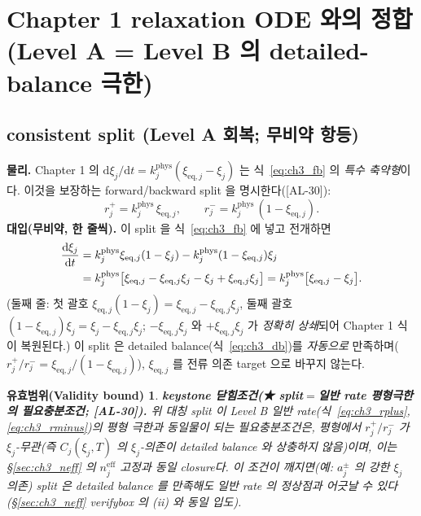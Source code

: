 \documentclass[11pt,a4paper]{article}
\newtheorem*{boundbox}{유효범위(Validity bound)}
\newcommand{\dd}{\mathrm{d}}
\newcommand{\eff}{\mathrm{eff}}
\newcommand{\eq}{\mathrm{eq}}
\newcommand{\AL}[1]{\textsf{[AL-#1]}}
\begin{document}
\section{Chapter 1 relaxation ODE 와의 정합 (Level A = Level B 의 detailed-balance 극한)}\label{sec:ch3_consistency}
\subsection{consistent split (Level A 회복; 무비약 항등)}\label{sec:ch3_split}
\textbf{물리.} Chapter 1 의 $\dd\xi_j/\dd t=k_j^{\mathrm{phys}}(\xi_{\eq,j}-\xi_j)$ 는 식~\eqref{eq:ch3_fb} 의
\emph{특수 축약형}이다. 이것을 보장하는 forward/backward split 을 명시한다(\AL{30}):
\begin{equation}
r_j^+=k_j^{\mathrm{phys}}\,\xi_{\eq,j},\qquad r_j^-=k_j^{\mathrm{phys}}\,(1-\xi_{\eq,j}).
\label{eq:ch3_split}
\end{equation}
\textbf{대입(무비약, 한 줄씩).} 이 split 을 식~\eqref{eq:ch3_fb} 에 넣고 전개하면
\begin{align}
\frac{\dd\xi_j}{\dd t}
&=k_j^{\mathrm{phys}}\xi_{\eq,j}(1-\xi_j)-k_j^{\mathrm{phys}}(1-\xi_{\eq,j})\xi_j \notag\\
&=k_j^{\mathrm{phys}}\big[\xi_{\eq,j}-\xi_{\eq,j}\xi_j-\xi_j+\xi_{\eq,j}\xi_j\big]
=k_j^{\mathrm{phys}}\big[\xi_{\eq,j}-\xi_j\big].
\label{eq:ch3_recover}
\end{align}
(둘째 줄: 첫 괄호 $\xi_{\eq,j}(1-\xi_j)=\xi_{\eq,j}-\xi_{\eq,j}\xi_j$, 둘째 괄호 $(1-\xi_{\eq,j})\xi_j=\xi_j-\xi_{\eq,j}\xi_j$;
$-\xi_{\eq,j}\xi_j$ 와 $+\xi_{\eq,j}\xi_j$ 가 \emph{정확히 상쇄}되어 Chapter 1 식이 복원된다.) 이 split 은
detailed balance(식~\eqref{eq:ch3_db})를 \emph{자동으로} 만족하며($r_j^+/r_j^-=\xi_{\eq,j}/(1-\xi_{\eq,j})$),
$\xi_{\eq,j}$ 를 전류 의존 target 으로 바꾸지 않는다.
\begin{boundbox}
\textbf{keystone 닫힘조건(★ split$=$일반 rate 평형극한의 필요충분조건; \AL{30}).} 위 대칭 split 이 Level B
일반 rate(식~\eqref{eq:ch3_rplus},\allowbreak\eqref{eq:ch3_rminus})의 \emph{평형 극한}과 동일물이 되는 필요충분조건은,
평형에서 $r_j^+/r_j^-$ 가 \emph{$\xi_j$-무관}(즉 $C_j(\xi_j,T)$ 의 $\xi_j$-의존이 detailed balance 와 상충하지
않음)이며, 이는 \S\ref{sec:ch3_neff} 의 $n_j^{\eff}$ 고정과 \emph{동일 closure}다. 이 조건이 깨지면(예: $a_j^\pm$ 의
강한 $\xi_j$ 의존) split 은 detailed balance 를 만족해도 일반 rate 의 정상점과 어긋날 수 있다(\S\ref{sec:ch3_neff}
verifybox 의 (ii) 와 동일 입도).
\end{boundbox}
\end{document}
